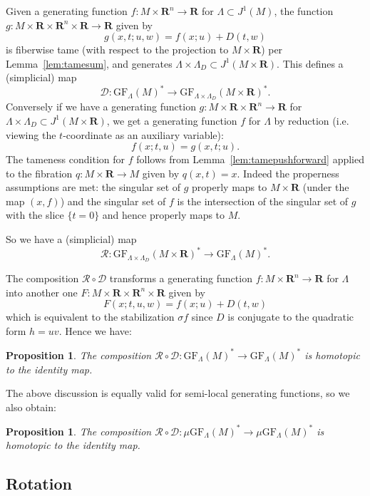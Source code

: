 \documentclass[12pt,a4paper]{article}
\numberwithin{equation}{section}
\newtheorem{proposition}[equation]{Proposition}
\theoremstyle{definition}
\theoremstyle{remark}
\newcommand{\R}{\mathbf{R}}
\newcommand{\DD}{\mathcal{D}}
\newcommand{\RR}{\mathcal{R}}
\newcommand{\GF}{\mathrm{GF}}
\begin{document}
Given a generating function $f:M\times \R^n\to \R$ for $\Lambda\subset J^1(M)$, the function $g:M\times \R\times \R^n \times \R \to \R$ given by
\[g(x,t;u,w)=f(x;u)+D(t,w)\]
is fiberwise tame (with respect to the projection to $M\times \R$) per Lemma~\ref{lem:tamesum}, and generates $\Lambda\times \Lambda_D\subset J^1(M\times \R)$.
This defines a (simplicial) map
\[\DD:\GF_\Lambda(M)^*\to \GF_{\Lambda\times \Lambda_D}(M\times \R)^*.\]
Conversely if we have a generating function $g:M\times \R\times \R^n\to \R$ for $\Lambda\times \Lambda_D \subset J^1(M\times \R)$, we get a generating function $f$
for $\Lambda$ by reduction (i.e. viewing the $t$-coordinate as an auxiliary variable):
\[f(x;t,u)=g(x,t;u).\]
The tameness condition for $f$ follows from Lemma~\ref{lem:tamepushforward} applied to the fibration $q:M\times \R\to M$ given by $q(x,t)=x$.
Indeed the properness assumptions are met: the singular set of $g$ properly maps to $M\times \R$ (under the map $(x,f)$) and the singular set of $f$ is the intersection of the singular set of $g$ with the slice $\{t=0\}$ and hence properly maps to $M$.

So we have a (simplicial) map
\[\RR:\GF_{\Lambda\times \Lambda_D}(M\times \R)^*\to \GF_\Lambda(M)^*.\]

The composition $\RR\circ \DD$ transforms a generating function $f:M\times \R^n\to \R$ for $\Lambda$ into another one $F:M\times \R\times \R^n\times \R$ given by
\[F(x;t,u,w)=f(x;u)+D(t,w)\]
which is equivalent to the stabilization $\sigma f$ since $D$ is conjugate to the quadratic form $h=uv$. Hence we have:

\begin{proposition} \label{prop:RD}
The composition $\RR\circ \DD : \GF_\Lambda(M)^*\to \GF_\Lambda(M)^*$ is homotopic to the identity map.
\end{proposition}

The above discussion is equally valid for semi-local generating functions, so we also obtain:
\begin{proposition}
The composition $\RR\circ \DD : \mu\GF_\Lambda(M)^*\to \mu\GF_\Lambda(M)^*$ is homotopic to the identity map.
\end{proposition}

\subsection{Rotation}
\end{document}
